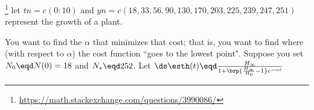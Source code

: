 \begin{example}
\footnote{
  \url{https://math.stackexchange.com/questions/3990086/}
  }
\label{ex:plant}
let $tn = c(0:10)$ and
$yn = c(18,33,56,90,130,170,203,225,239,247,251)$ represent the growth of a plant.

 You want to find the $\alpha $ that minimizes that cost; that is, you want to find where (with respect to $\alpha $) the cost function 
``goes to the lowest point". 
Suppose you set $N_0\eqd N(0)=18$ and $N_*\eqd252$. %
Let 
$\ds \esth(t) \eqd \frac{H_{\infty}}{1+\brp{\frac{H_{\infty}}{H_0}-1}e^{-\alpha t}}$
\end{example}
